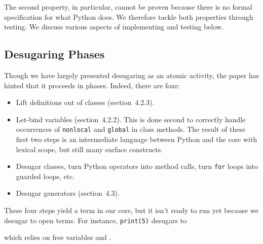 \documentclass[10pt]{sigplanconf}
\newcommand{\SecRef}[2]{section~#1}
\newcommand{\SecRefLocal}[3]{\SecRef{#2}{#3}}
\newcommand{\Scribtexttt}[1]{{\texttt{#1}}}
\newlength{\stabLeft}
\newcommand{\atItemizeStart}[0]{\addtolength{\stabLeft}{\labelsep}
                                \addtolength{\stabLeft}{\labelwidth}}
\newenvironment{SCentered}{\begin{trivlist}\item \centering}{\end{trivlist}}
\let\SOriginalthesubsubsection\thesubsubsection
\newcommand{\Ssubsection}[2]{\subsection[#1]{#2}\let\thesubsubsection\SOriginalthesubsubsection}
\begin{document}
\noindent The second property, in particular, cannot be proven because there is
no formal specification for what Python does. We therefore tackle both
properties through testing. We discuss various aspects of implementing
and testing below.

\Ssubsection{Desugaring Phases}{Desugaring Phases}\label{t:x28part_x22Desugaringx5fPhasesx22x29}

Though we have largely presented desugaring as an atomic activity, the
paper has hinted that it proceeds in phases. Indeed, there are four:


\noindent \begin{itemize}\atItemizeStart

\item Lift definitions out of classes (\SecRefLocal{t:x28part_x22sx3aclassx2dscopex22x29}{4.2.3}{Classes and Scope}).

\item Let{-}bind variables (\SecRefLocal{t:x28part_x22sx3anonlocalx2dscopex22x29}{4.2.2}{Closing Over Variables}). This is done second to correctly
handle occurrences of \Scribtexttt{nonlocal} and \Scribtexttt{global} in class methods.
The result of these first two steps is an intermediate language between
Python and the core with lexical scope, but still many surface constructs.

\item Desugar classes, turn Python operators into method calls, turn
\Scribtexttt{for} loops into guarded  loops, etc.

\item Desugar generators (\SecRefLocal{t:x28part_x22sx3ageneratorsx2dreduxx22x29}{4.3}{Generators Redux}).\end{itemize}

\noindent These four steps yield a term in our core, but it isn{'}t ready to
run yet because we desugar to open terms. For instance, \Scribtexttt{print(5)}
desugars to


\noindent \begin{SCentered}\end{SCentered}

\noindent which relies on free variables  and .
\end{document}
